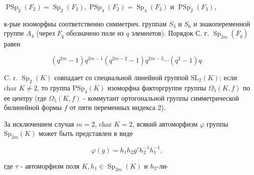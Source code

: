 \documentclass[10pt]{article}
\begin{document}
$\operatorname{PSp}_{2}\left(F_{2}\right)=\operatorname{Sp}_{2}\left(F_{2}\right), \operatorname{PSp}_{4}\left(F_{2}\right)=\operatorname{Sp}_{4}\left(F_{2}\right)$ и $\operatorname{PSp}_{2}\left(F_{3}\right)$,



к-рые изоморфны соответственно симметрич. группам $S_{3}$ и $S_{6}$ и знакопеременной группе $A_{4}$ (через $F_{q}$ обозначено поле из $q$ элементов). Порядок С. г. $\operatorname{Sp}_{2 m}\left(F_{q}\right)$ равен



\[

\left(q^{2 m}-1\right) q^{2 m-1}\left(q^{2 m-2}-1\right) q^{2 m-3} \cdots\left(q^{2}-1\right) q .

\]



C. r. $\operatorname{Sp}_{2}(K)$ совпадает со специальной линейной группой $\mathrm{SL}_{2}(K)$; если char $K \neq 2$, то группа $\mathrm{PSp}_{4}(K)$ изоморфна факторгруппе группы $\Omega_{5}(K, f)$ по ее центру (где $\Omega_{5}(K, f)$ - коммутант ортогональной группы симметрической билинейной формы $f$ от пяти переменных индекса 2).



За исключением случая $m=2$, char $K=2$, всякий автоморфизм $\varphi$ группы $\mathrm{Sp}_{2 m}(K)$ может быть представлен в виде



\[

\varphi(g)=h_{1} h_{2} g^{\tau} h_{2}^{-1} h_{1}^{-1},

\]



где $\tau$ - автоморфизм поля $K, h_{1} \in \operatorname{Sp}_{2 m}(K)$ и $h_{2}$-ли-
\end{document}
